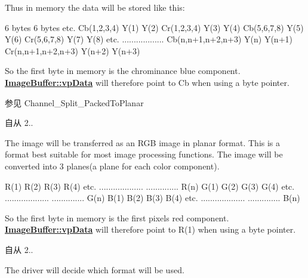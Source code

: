\begin{Desc}
\begin{description}
Thus in memory the data will be stored like this\+:


\begin{DoxyCode}
6 bytes                                     6 bytes                                     etc.
Cb(1,2,3,4) Y(1) Y(2) Cr(1,2,3,4) Y(3) Y(4) Cb(5,6,7,8) Y(5) Y(6) Cr(5,6,7,8) Y(7) Y(8) etc.
..................                          Cb(n,n+1,n+2,n+3) Y(n) Y(n+1) Cr(n,n+1,n+2,n+3) Y(n+2) Y(n+3)
\end{DoxyCode}


So the first byte in memory is the chrominance blue component. {\bfseries \hyperlink{struct_image_buffer_ab67c9c21d749e786302c848b508e0673}{Image\+Buffer\+::vp\+Data}} will therefore point to Cb when using a byte pointer.

\begin{DoxySeeAlso}{参见}
Channel\+\_\+\+Split\+\_\+\+Packed\+To\+Planar
\end{DoxySeeAlso}
\begin{DoxySince}{自从}
2.. 
\end{DoxySince}
\item[{\em 
\hypertarget{group___common_interface_gga456e8aa76e06bb761f27c52141475985a42ea32a6ebfb2a6c6a2805438848ad5a}{ibpf\+R\+G\+B888\+Planar}\label{group___common_interface_gga456e8aa76e06bb761f27c52141475985a42ea32a6ebfb2a6c6a2805438848ad5a}
}]The image will be transferred as an R\+G\+B image in planar format. This is a format best suitable for most image processing functions. The image will be converted into 3 planes(a plane for each color component).


\begin{DoxyCode}
R(1) R(2) R(3) R(4) etc.
...................
.............. R(n)
G(1) G(2) G(3) G(4) etc.
...................
.............. G(n)
B(1) B(2) B(3) B(4) etc.
...................
.............. B(n)
\end{DoxyCode}


So the first byte in memory is the first pixels red component. {\bfseries \hyperlink{struct_image_buffer_ab67c9c21d749e786302c848b508e0673}{Image\+Buffer\+::vp\+Data}} will therefore point to R(1) when using a byte pointer.

\begin{DoxySince}{自从}
2.. 
\end{DoxySince}
\item[{\em 
\hypertarget{group___common_interface_gga456e8aa76e06bb761f27c52141475985a0a70ec707cba7031e5f732d3935aab17}{ibpf\+Auto}\label{group___common_interface_gga456e8aa76e06bb761f27c52141475985a0a70ec707cba7031e5f732d3935aab17}
}]The driver will decide which format will be used. \end{description}
\end{Desc}

